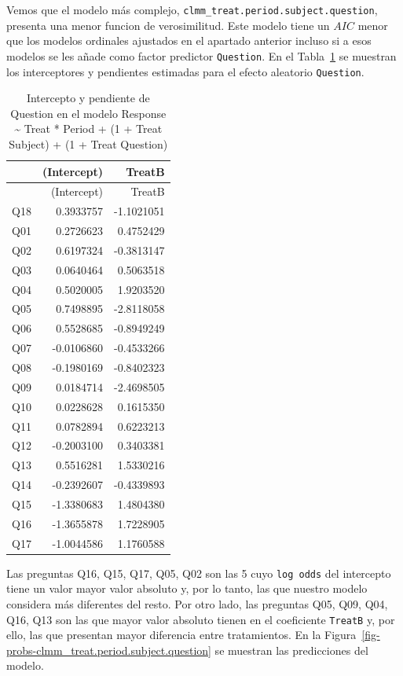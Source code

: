 \documentclass[
  12pt,
  a4paper,
  extrafontsizes,
  onecolumn,
  openright]{memoir}
\begin{document}
\normalsize

Vemos que el modelo más complejo,
\texttt{clmm\_treat.period.subject.question}, presenta una menor funcion
de verosimilitud. Este modelo tiene un \(AIC\) menor que los modelos
ordinales ajustados en el apartado anterior incluso si a esos modelos se
les añade como factor predictor \texttt{Question}. En el
Tabla~\ref{tbl-question-intercepts} se muestran los interceptores y
pendientes estimadas para el efecto aleatorio \texttt{Question}.

\hypertarget{tbl-question-intercepts}{}
\begin{longtable}[]{@{}lrr@{}}
\caption{\label{tbl-question-intercepts}Intercepto y pendiente de
Question en el modelo Response \textasciitilde{} Treat * Period + (1 +
Treat \textbar{} Subject) + (1 + Treat \textbar{}
Question)}\tabularnewline
\toprule\noalign{}
& (Intercept) & TreatB \\
\midrule\noalign{}
\endfirsthead
\toprule\noalign{}
& (Intercept) & TreatB \\
\midrule\noalign{}
\endhead
\bottomrule\noalign{}
\endlastfoot
Q18 & 0.3933757 & -1.1021051 \\
Q01 & 0.2726623 & 0.4752429 \\
Q02 & 0.6197324 & -0.3813147 \\
Q03 & 0.0640464 & 0.5063518 \\
Q04 & 0.5020005 & 1.9203520 \\
Q05 & 0.7498895 & -2.8118058 \\
Q06 & 0.5528685 & -0.8949249 \\
Q07 & -0.0106860 & -0.4533266 \\
Q08 & -0.1980169 & -0.8402323 \\
Q09 & 0.0184714 & -2.4698505 \\
Q10 & 0.0228628 & 0.1615350 \\
Q11 & 0.0782894 & 0.6223213 \\
Q12 & -0.2003100 & 0.3403381 \\
Q13 & 0.5516281 & 1.5330216 \\
Q14 & -0.2392607 & -0.4339893 \\
Q15 & -1.3380683 & 1.4804380 \\
Q16 & -1.3655878 & 1.7228905 \\
Q17 & -1.0044586 & 1.1760588 \\
\end{longtable}

Las preguntas Q16, Q15, Q17, Q05, Q02 son las 5 cuyo \texttt{log\ odds}
del intercepto tiene un valor mayor valor absoluto y, por lo tanto, las
que nuestro modelo considera más diferentes del resto. Por otro lado,
las preguntas Q05, Q09, Q04, Q16, Q13 son las que mayor valor absoluto
tienen en el coeficiente \texttt{TreatB} y, por ello, las que presentan
mayor diferencia entre tratamientos. En la
Figura~\ref{fig-probs-clmm_treat.period.subject.question} se muestran
las predicciones del modelo.
\end{document}
